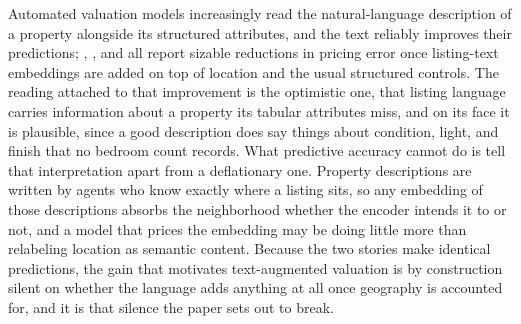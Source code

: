 \documentclass{article}
\begin{document}
Automated valuation models increasingly read the natural-language description of a property alongside its structured attributes, and the text reliably improves their predictions; \citet{shen2021information}, \citet{baur2023automated}, and \citet{lorenz2023interpretable} all report sizable reductions in pricing error once listing-text embeddings are added on top of location and the usual structured controls. The reading attached to that improvement is the optimistic one, that listing language carries information about a property its tabular attributes miss, and on its face it is plausible, since a good description does say things about condition, light, and finish that no bedroom count records. What predictive accuracy cannot do is tell that interpretation apart from a deflationary one. Property descriptions are written by agents who know exactly where a listing sits, so any embedding of those descriptions absorbs the neighborhood whether the encoder intends it to or not, and a model that prices the embedding may be doing little more than relabeling location as semantic content. Because the two stories make identical predictions, the gain that motivates text-augmented valuation is by construction silent on whether the language adds anything at all once geography is accounted for, and it is that silence the paper sets out to break.
\end{document}
